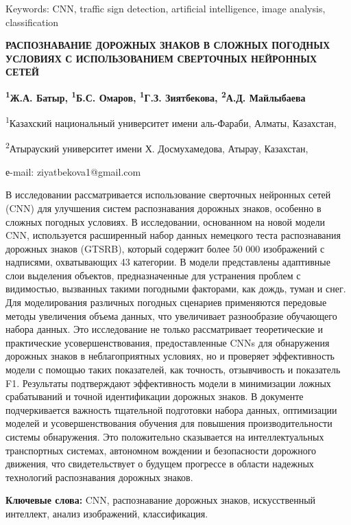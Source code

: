 Keywords: CNN, traffic sign detection, artificial intelligence, image
analysis, classification

\begin{center}
{\large\bfseries РАСПОЗНАВАНИЕ ДОРОЖНЫХ ЗНАКОВ В СЛОЖНЫХ ПОГОДНЫХ УСЛОВИЯХ С
ИСПОЛЬЗОВАНИЕМ СВЕРТОЧНЫХ НЕЙРОННЫХ СЕТЕЙ}

{\bfseries \textsuperscript{1}Ж.А. Батыр, \textsuperscript{1}Б.С. Омаров,
\textsuperscript{1}Г.З. Зиятбекова\envelope, \textsuperscript{2}А.Д. Майлыбаева}

\textsuperscript{1}Казахский национальный университет имени аль-Фараби,
Алматы, Казахстан,

\textsuperscript{2}Атырауский университет имени Х. Досмухамедова,
Атырау, Казахстан,

е-mail: ziyatbekova1@gmail.com
\end{center}

В исследовании рассматривается использование сверточных нейронных сетей
(CNN) для улучшения систем распознавания дорожных знаков, особенно в
сложных погодных условиях. В исследовании, основанном на новой модели
CNN, используется расширенный набор данных немецкого теста распознавания
дорожных знаков (GTSRB), который содержит более 50 000 изображений с
надписями, охватывающих 43 категории. В модели представлены адаптивные
слои выделения объектов, предназначенные для устранения проблем с
видимостью, вызванных такими погодными факторами, как дождь, туман и
снег. Для моделирования различных погодных сценариев применяются
передовые методы увеличения объема данных, что увеличивает разнообразие
обучающего набора данных. Это исследование не только рассматривает
теоретические и практические усовершенствования, предоставленные CNNs
для обнаружения дорожных знаков в неблагоприятных условиях, но и
проверяет эффективность модели с помощью таких показателей, как
точность, отзывчивость и показатель F1. Результаты подтверждают
эффективность модели в минимизации ложных срабатываний и точной
идентификации дорожных знаков. В документе подчеркивается важность
тщательной подготовки набора данных, оптимизации моделей и
усовершенствования обучения для повышения производительности системы
обнаружения. Это положительно сказывается на интеллектуальных
транспортных системах, автономном вождении и безопасности дорожного
движения, что свидетельствует о будущем прогрессе в области надежных
технологий распознавания дорожных знаков.

{\bfseries Ключевые слова:} CNN, распознавание дорожных знаков,
искусственный интеллект, анализ изображений, классификация.

